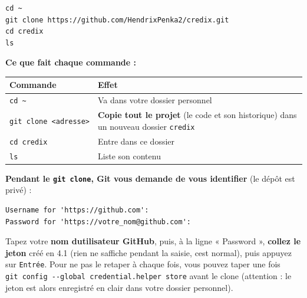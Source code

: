 \documentclass[
  french,
  11pt,
  a4paper,
]{article}
\begin{document}
\begin{Verbatim}[breaklines=true,breakanywhere=true,fontsize=\small,frame=leftline,framerule=1.6pt,rulecolor=\color{credixblue},framesep=3mm,xleftmargin=2mm,xrightmargin=1mm]
cd ~
git clone https://github.com/HendrixPenka2/credix.git
cd credix
ls
\end{Verbatim}

\textbf{Ce que fait chaque commande :}

\begin{longtable}[]{@{}
  >{\raggedright\arraybackslash}p{}
  >{\raggedright\arraybackslash}p{}@{}}
\toprule\noalign{}
\begin{minipage}[b]{\linewidth}\raggedright
Commande
\end{minipage} & \begin{minipage}[b]{\linewidth}\raggedright
Effet
\end{minipage} \\
\midrule\noalign{}
\endhead
\bottomrule\noalign{}
\endlastfoot
\texttt{cd\ \textasciitilde{}} & Va dans votre dossier personnel \\
\texttt{git\ clone\ \textless{}adresse\textgreater{}} & \textbf{Copie
tout le projet} (le code et son historique) dans un nouveau dossier
\texttt{credix} \\
\texttt{cd\ credix} & Entre dans ce dossier \\
\texttt{ls} & Liste son contenu \\
\end{longtable}

\textbf{Pendant le \texttt{git\ clone}, Git vous demande de vous
identifier} (le dépôt est privé) :

\begin{Verbatim}[breaklines=true,breakanywhere=true,fontsize=\small,frame=leftline,framerule=1.6pt,rulecolor=\color{credixblue},framesep=3mm,xleftmargin=2mm,xrightmargin=1mm]
Username for 'https://github.com':
Password for 'https://votre_nom@github.com':
\end{Verbatim}

Tapez votre \textbf{nom d\textquotesingle utilisateur GitHub}, puis, à
la ligne « Password », \textbf{collez le jeton} créé en 4.1 (rien ne
s\textquotesingle affiche pendant la saisie, c\textquotesingle est
normal), puis appuyez sur \texttt{Entrée}. Pour ne pas le retaper à
chaque fois, vous pouvez taper une fois
\texttt{git\ config\ -\allowbreak{}-\allowbreak{}global\ credential.\allowbreak{}helper\ store}
avant le clone (attention : le jeton est alors enregistré en clair dans
votre dossier personnel).
\end{document}
